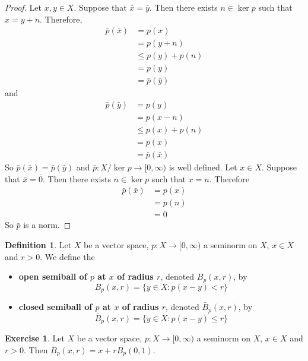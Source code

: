 \documentclass[12pt]{amsart}
\theoremstyle{definition}
\newtheorem{defn}[definition]{Definition}
\newtheorem{ex}[definition]{Exercise}
\newcommand{\tbf}[1]{\textbf{#1}}
\newcommand{\Rg}{[0,\infty)}
\DeclareMathOperator*{\0}{\mbf{0}}
\DeclareMathOperator*{\1}{\mbf{1}}
\begin{document}
	\begin{proof}
		Let $x, y \in X$. Suppose that $\bar{x} = \bar{y}$. Then there exists $n \in \ker p$ such that $x = y + n$. Therefore, 
		\begin{align*}
			\bar{p}(\bar{x}) 
			&= p(x) \\
			&= p(y + n) \\
			&\leq p(y) + p(n) \\
			&= p(y) \\
			&= \bar{p}(\bar{y})
		\end{align*}
		and 
		\begin{align*}
			\bar{p}(\bar{y}) 
			&= p(y) \\
			&= p(x - n) \\
			&\leq p(x) + p(n) \\
			&= p(x) \\
			&= \bar{p}(\bar{x})
		\end{align*}
		So $\bar{p}(\bar{x}) = \bar{p}(\bar{y})$ and $\bar{p}: X / \ker p \rightarrow \Rg$ is well defined. Let $x \in X$. Suppose that $\bar{x} = \bar{0}$. Then there exists $n \in \ker p$ such that $x = n$. Therefore 
		\begin{align*}
			\bar{p}(\bar{x}) 
			&= p(x) \\
			&= p(n) \\
			&= 0
		\end{align*}
		So $\bar{p}$ is a norm.
	\end{proof}

	
	\begin{defn}
		Let $X$ be a vector space, $p:X \rightarrow \Rg$ a seminorm on $X$, $x \in X$ and $r >0$. We define the 
		\begin{itemize}
			\item \tbf{open semiball of $p$ at $x$ of radius $r$}, denoted $B_p(x, r)$, by $$B_p(x, r) = \{y \in X: p(x - y) < r\}$$
			\item \tbf{closed semiball of $p$ at $x$ of radius $r$}, denoted $\bar{B}_p(x, r)$, by $$\bar{B}_p(x, r) = \{y \in X: p(x - y) \leq r\}$$
		\end{itemize}
	\end{defn}

	\begin{ex} 
		Let $X$ be a vector space, $p:X \rightarrow \Rg$ a seminorm on $X$, $x \in X$ and $r >0$. Then $B_p(x, r) =  x + rB_p(0, 1)$. 
	\end{ex}
\end{document}
